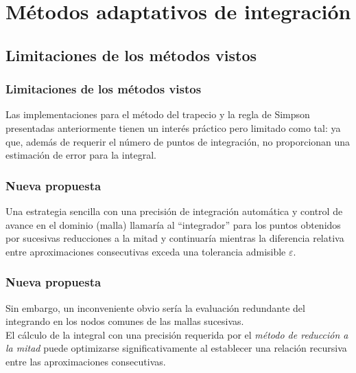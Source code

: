 \section{Métodos adaptativos de integración}
\subsection*{Limitaciones de los métodos vistos}
\begin{frame}
\frametitle{Limitaciones de los métodos vistos}
Las implementaciones para el método del trapecio y la regla de Simpson presentadas anteriormente tienen un interés práctico pero limitado como tal: ya que, además de requerir el número de puntos de integración, no proporcionan una estimación de error para la integral.
\end{frame}
\begin{frame}
\frametitle{Nueva propuesta}
Una estrategia sencilla con una precisión de integración automática y control de avance en el dominio (malla) llamaría al \enquote{integrador} para los puntos obtenidos por sucesivas reducciones a la mitad y continuaría mientras la diferencia relativa entre aproximaciones consecutivas exceda una tolerancia admisible $\varepsilon$.
\end{frame}
\begin{frame}
\frametitle{Nueva propuesta}
Sin embargo, un inconveniente obvio sería la evaluación redundante del integrando en los nodos comunes de las mallas sucesivas.
\\
\bigskip
El cálculo de la integral con una precisión requerida por el \emph{método de reducción a la mitad} puede optimizarse significativamente al establecer una relación recursiva entre las aproximaciones consecutivas.
\end{frame}

